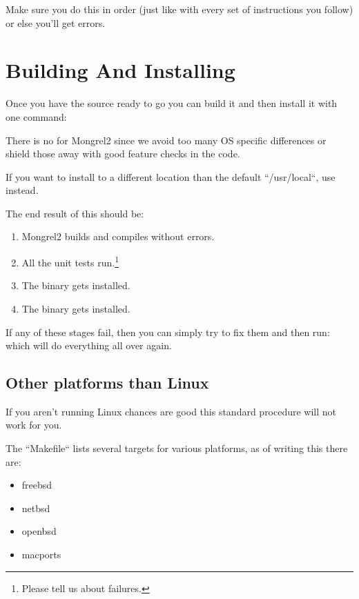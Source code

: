 Make sure you do this in order (just like with every set of instructions you follow)
or else you'll get errors.


\section{Building And Installing}

Once you have the source ready to go you can build it and then install it with
one command:  

There is no  for Mongrel2 since we avoid too many OS specific
differences or shield those away with good feature checks in the code.

If you want to install to a different location than the default  ``/usr/local``,
use  instead.

The end result of this should be:

\begin{enumerate}
\item Mongrel2 builds and compiles without errors.
\item All the unit tests run.\footnote{Please tell us about failures.}
\item The  binary gets installed.
\item The  binary gets installed.
\end{enumerate}

If any of these stages fail, then you can simply try to fix them and then
run:   which will do everything all over again.

\subsection{Other platforms than Linux}

If you aren't running Linux chances are good this standard procedure will not work for you.

The ``Makefile`` lists several targets for various platforms, as of writing this there are:

\begin{itemize}
\item freebsd
\item netbsd
\item openbsd
\item macports
\end{itemize}

